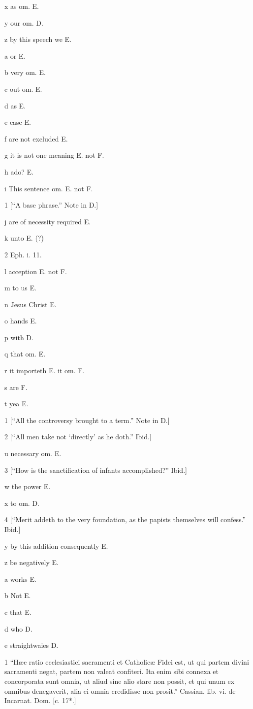 x
as om. E.

y
our om. D.

z
by this speech we E.

a
or E.

b
very om. E.

c
out om. E.

d
as E.

e
case E.

f
are not excluded E.

g
it is not one meaning E. not F.

h
ado? E.

i
This sentence om. E. not F.

1
[“A base phrase.” Note in D.]

j
are of necessity required E.

k
unto E. (?)

2
Eph. i. 11.

l
acception E. not F.

m
to us E.

n
Jesus Christ E.

o
hands E.

p
with D.

q
that om. E.

r
it importeth E. it om. F.

s
are F.

t
yea E.

1
[“All the controversy brought to a term.” Note in D.]

2
[“All men take not ‘directly’ as he doth.” Ibid.]

u
necessary om. E.

3
[“How is the sanctification of infants accomplished?” Ibid.]

w
the power E.

x
to om. D.

4
[“Merit addeth to the very foundation, as the papists themselves will confess.” Ibid.]

y
by this addition consequently E.

z
be negatively E.

a
works E.

b
Not E.

c
that E.

d
who D.

e
straightwaies D.

1
“Hæc ratio ecclesiastici sacramenti et Catholicæ Fidei est, ut qui partem divini sacramenti negat, partem non valeat confiteri. Ita enim sibi connexa et concorporata sunt omnia, ut aliud sine alio stare non possit, et qui unum ex omnibus denegaverit, alia ei omnia credidisse non prosit.” Cassian. lib. vi. de Incarnat. Dom. [c. 17*.]


